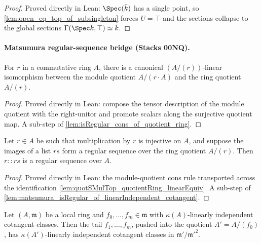 \begin{proof}
  Proved directly in Lean: \(\Spec(\bar k)\) has a single point, so
  \cref{lem:open_eq_top_of_subsingleton} forces \(U = \top\) and the sections collapse
  to the global sections \(\Gamma(\Spec \bar k, \top) \simeq \bar k\).
\end{proof}

\paragraph{Matsumura regular-sequence bridge (Stacks 00NQ).}

\begin{lemma}
  \label{lem:quotSMulTop_quotientRing_linearEquiv}
  For \(r\) in a commutative ring \(A\), there is a canonical \((A/(r))\)-linear
  isomorphism between the module quotient \(A/(r \cdot A)\) and the ring quotient
  \(A/(r)\).
\end{lemma}

\begin{proof}
  Proved directly in Lean: compose the tensor description of the module quotient with
  the right-unitor and promote scalars along the surjective quotient map. A sub-step of
  \cref{lem:isRegular_cons_of_quotient_ring}.
\end{proof}

\begin{lemma}
  \label{lem:isRegular_cons_of_quotient_ring}
  Let \(r \in A\) be such that multiplication by \(r\) is injective on \(A\), and
  suppose the images of a list \(rs\) form a regular sequence over the ring quotient
  \(A/(r)\). Then \(r :: rs\) is a regular sequence over \(A\).
\end{lemma}

\begin{proof}
  Proved directly in Lean: the module-quotient cons rule transported across the
  identification \cref{lem:quotSMulTop_quotientRing_linearEquiv}. A sub-step of
  \cref{lem:matsumura_isRegular_of_linearIndependent_cotangent}.
\end{proof}

\begin{lemma}
  \label{lem:matsumura_descent_cotangent}
  Let \((A, \mathfrak m)\) be a local ring and \(f_0,\dots,f_m \in \mathfrak m\) with
  \(\kappa(A)\)-linearly independent cotangent classes. Then the tail
  \(f_1,\dots,f_m\), pushed into the quotient \(A' = A/(f_0)\), has
  \(\kappa(A')\)-linearly independent cotangent classes in
  \(\mathfrak m'/\mathfrak m'^2\).
\end{lemma}

